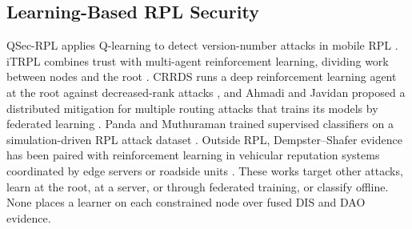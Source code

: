 \subsection{Learning-Based RPL Security}
QSec-RPL applies Q-learning to detect version-number attacks in mobile RPL \cite{qsecrpl2023}. iTRPL combines trust with multi-agent reinforcement learning, dividing work between nodes and the root \cite{itrpl2024}. CRRDS runs a deep reinforcement learning agent at the root against decreased-rank attacks \cite{haqdad2026}, and Ahmadi and Javidan proposed a distributed mitigation for multiple routing attacks that trains its models by federated learning \cite{ahmadi2026}. Panda and Muthuraman trained supervised classifiers on a simulation-driven RPL attack dataset \cite{panda2026}. Outside RPL, Dempster--Shafer evidence has been paired with reinforcement learning in vehicular reputation systems coordinated by edge servers or roadside units \cite{gyawali2021,jasti2024}. These works target other attacks, learn at the root, at a server, or through federated training, or classify offline. None places a learner on each constrained node over fused DIS and DAO evidence.

